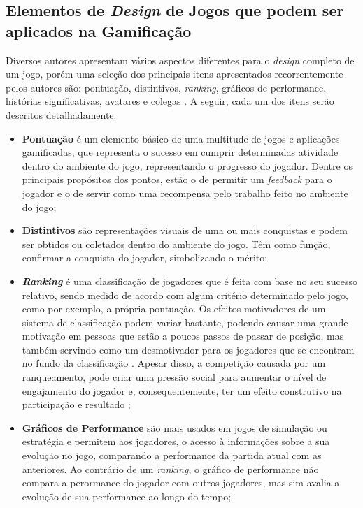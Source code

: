 \subsection{Elementos de \textit{Design} de Jogos que podem ser aplicados na Gamificação}

Diversos autores apresentam vários aspectos diferentes para o \textit{design} completo de um jogo, porém uma seleção dos principais itens apresentados recorrentemente pelos autores são: pontuação, distintivos, \textit{ranking}, gráficos de performance, histórias significativas, avatares e colegas \cite{gamification_motivates}. A seguir, cada um dos itens serão descritos detalhadamente.

\begin{itemize}
    \item \textbf{Pontuação} é um elemento básico de uma multitude de jogos e aplicações gamificadas, que representa o sucesso em cumprir  determinadas atividade dentro do ambiente do jogo, representando o progresso do jogador. Dentre os principais propósitos dos pontos, estão o de permitir um \textit{feedback} para o jogador e o de servir como uma recompensa pelo trabalho feito no ambiente do jogo;
    \item \textbf{Distintivos} são representações visuais de uma ou mais conquistas e podem ser obtidos ou coletados dentro do ambiente do jogo. Têm como função, confirmar a conquista do jogador, simbolizando o mérito;
    \item \textbf{\textit{Ranking}} é uma classificação de jogadores que é feita com base no seu sucesso relativo, sendo medido de acordo com algum critério determinado pelo jogo, como por exemplo, a própria pontuação. Os efeitos motivadores de um sistema de classificação podem variar bastante, podendo causar uma grande motivação em pessoas que estão a poucos passos de passar de posição, mas também servindo como um desmotivador para os jogadores que se encontram no fundo da classificação \cite{ranking_motivation}. Apesar disso, a competição causada por um ranqueamento, pode criar uma pressão social para aumentar o nível de engajamento do jogador e, consequentemente, ter um efeito construtivo na participação e resultado \cite{ranking_competition};
    \item \textbf{Gráficos de Performance} são mais usados em jogos de simulação ou estratégia e permitem aos jogadores, o acesso à informações sobre a sua evolução no jogo, comparando a performance da partida atual com as anteriores. Ao contrário de um \textit{ranking}, o gráfico de performance não compara a perormance do jogador com outros jogadores, mas sim avalia a evolução de sua performance ao longo do tempo;

\end{itemize}
